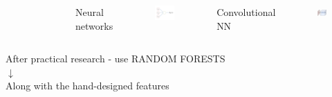\documentclass[10pt]{beamer}
\begin{document}
\begin{frame}[fragile]
\begin{columns}[T,onlytextwidth]
\begin{figure}
	\end{figure}
	\centering
	Neural networks
	\begin{figure}
		\centering
		\includegraphics[width=.20\paperwidth]{logistic_unit.pdf}
	\end{figure}
	\centering
	Convolutional NN
	\begin{figure}
		\centering
		\includegraphics[width=.20\paperwidth]{depthcol.jpeg}
	\end{figure}
\end{columns}
  
\begin{center}
             After practical research - use \alert{RANDOM FORESTS}\\
             $\downarrow$ \\
             Along with the hand-designed features
\end{center}
  
\end{frame}
\end{document}
